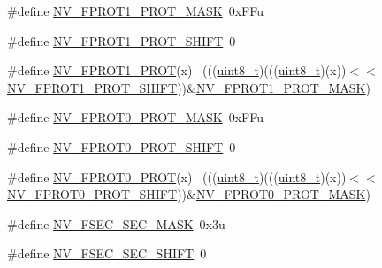 \begin{DoxyCompactItemize}
\item 
\#define \hyperlink{group___n_v___register___masks_ga4ca39bad3b57769cb423f1616c985e38}{N\+V\+\_\+\+F\+P\+R\+O\+T1\+\_\+\+P\+R\+O\+T\+\_\+\+M\+A\+SK}~0x\+F\+Fu
\item 
\#define \hyperlink{group___n_v___register___masks_ga06d0cb2797f243b77d60cfecedfc9f86}{N\+V\+\_\+\+F\+P\+R\+O\+T1\+\_\+\+P\+R\+O\+T\+\_\+\+S\+H\+I\+FT}~0
\item 
\#define \hyperlink{group___n_v___register___masks_gaf206463f78b039135d71cfd13dc43193}{N\+V\+\_\+\+F\+P\+R\+O\+T1\+\_\+\+P\+R\+OT}(x)                                            ~(((\hyperlink{_p_e___types_8h_aba7bc1797add20fe3efdf37ced1182c5}{uint8\+\_\+t})(((\hyperlink{_p_e___types_8h_aba7bc1797add20fe3efdf37ced1182c5}{uint8\+\_\+t})(x))$<$$<$\hyperlink{group___n_v___register___masks_ga06d0cb2797f243b77d60cfecedfc9f86}{N\+V\+\_\+\+F\+P\+R\+O\+T1\+\_\+\+P\+R\+O\+T\+\_\+\+S\+H\+I\+FT}))\&\hyperlink{group___n_v___register___masks_ga4ca39bad3b57769cb423f1616c985e38}{N\+V\+\_\+\+F\+P\+R\+O\+T1\+\_\+\+P\+R\+O\+T\+\_\+\+M\+A\+SK})
\item 
\#define \hyperlink{group___n_v___register___masks_gafb9244a297e4e856c53e7cb9515d8549}{N\+V\+\_\+\+F\+P\+R\+O\+T0\+\_\+\+P\+R\+O\+T\+\_\+\+M\+A\+SK}~0x\+F\+Fu
\item 
\#define \hyperlink{group___n_v___register___masks_gaaae2badd9a03af803a09537c6c89382a}{N\+V\+\_\+\+F\+P\+R\+O\+T0\+\_\+\+P\+R\+O\+T\+\_\+\+S\+H\+I\+FT}~0
\item 
\#define \hyperlink{group___n_v___register___masks_ga1e5d89ac9195a6ed439fefb7d2200cac}{N\+V\+\_\+\+F\+P\+R\+O\+T0\+\_\+\+P\+R\+OT}(x)                                            ~(((\hyperlink{_p_e___types_8h_aba7bc1797add20fe3efdf37ced1182c5}{uint8\+\_\+t})(((\hyperlink{_p_e___types_8h_aba7bc1797add20fe3efdf37ced1182c5}{uint8\+\_\+t})(x))$<$$<$\hyperlink{group___n_v___register___masks_gaaae2badd9a03af803a09537c6c89382a}{N\+V\+\_\+\+F\+P\+R\+O\+T0\+\_\+\+P\+R\+O\+T\+\_\+\+S\+H\+I\+FT}))\&\hyperlink{group___n_v___register___masks_gafb9244a297e4e856c53e7cb9515d8549}{N\+V\+\_\+\+F\+P\+R\+O\+T0\+\_\+\+P\+R\+O\+T\+\_\+\+M\+A\+SK})
\item 
\#define \hyperlink{group___n_v___register___masks_gab159c721c6cde1f629b630c573da8ea9}{N\+V\+\_\+\+F\+S\+E\+C\+\_\+\+S\+E\+C\+\_\+\+M\+A\+SK}~0x3u
\item 
\#define \hyperlink{group___n_v___register___masks_ga92a819b24b0472a83857ddd2d950ab08}{N\+V\+\_\+\+F\+S\+E\+C\+\_\+\+S\+E\+C\+\_\+\+S\+H\+I\+FT}~0
\item 

\end{DoxyCompactItemize}
